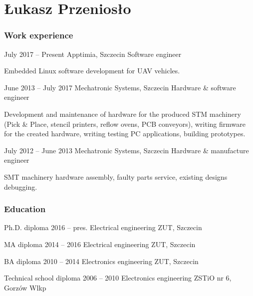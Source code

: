 \documentclass{tccv}
\begin{document}
\part{Łukasz Przeniosło}

\section{Work experience}

\begin{eventlist}

\item{July 2017 -- Present}
     {Apptimia, Szczecin}
     {Software engineer}
     
Embedded Linux software development for UAV vehicles.

\item{June 2013 -- July 2017}
     {Mechatronic Systems, Szczecin}
     {Hardware \& software engineer}
     
Development and maintenance of hardware for the produced STM machinery (Pick \& Place, stencil printers, reflow ovens, PCB conveyors), writing firmware for the created hardware, writing testing PC applications, building prototypes. 

\item{July 2012 -- June 2013}
     {Mechatronic Systems, Szczecin}
     {Hardware \& manufacture engineer}

SMT machinery hardware assembly, faulty parts service, existing designs debugging. 

\end{eventlist}

\section{Education}

\begin{yearlist}

\item[Ph.D. diploma]{2016 -- pres.}
     {Electrical engineering}
     {ZUT, Szczecin}

\item[MA diploma]{2014 -- 2016}
     {Electrical engineering}
     {ZUT, Szczecin}

\item[BA diploma]{2010 -- 2014}
     {Electronics engineering}
     {ZUT, Szczecin}

\item[Technical school diploma]{2006 -- 2010}
     {Electronics engineering}
     {ZSTiO nr 6, Gorzów Wlkp}

\end{yearlist}
\end{document}
